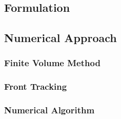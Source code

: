 \documentclass[12pt]{article}
\begin{document}
\subsection{Formulation}


\subsection{Numerical Approach}

\subsubsection{Finite Volume Method}

\subsubsection{Front Tracking}



\subsubsection{Numerical Algorithm }
\end{document}
